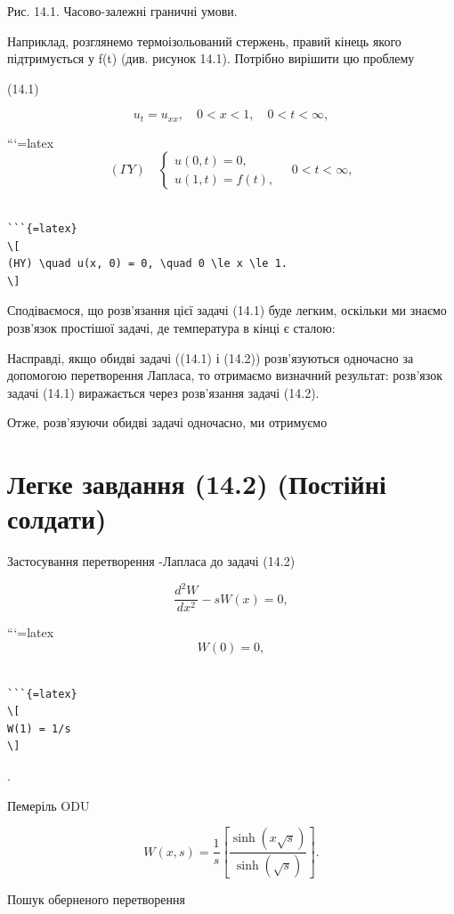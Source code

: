 \documentclass[
]{article}
\begin{document}
Рис. 14.1. Часово-залежні граничні умови.

Наприклад, розглянемо термоізольований стержень, правий кінець якого
підтримується у f(t) (див. рисунок 14.1). Потрібно вирішити цю проблему

(14.1)

\[
u_{t} = u_{xx}, \quad 0 < x < 1, \quad 0 < t < \infty,
\]

```{=latex}
\[
(\Gamma Y) \quad \begin{cases} u(0, t) = 0, \\ u(1, t) = f(t), \end{cases} \quad 0 < t < \infty,
\]

\begin{verbatim}

```{=latex}
\[
(HY) \quad u(x, 0) = 0, \quad 0 \le x \le 1.
\]
\end{verbatim}

Сподіваємося, що розв'язання цієї задачі (14.1) буде легким, оскільки ми
знаємо розв'язок простішої задачі, де температура в кінці є сталою:

Насправді, якщо обидві задачі ((14.1) і (14.2)) розв'язуються одночасно
за допомогою перетворення Лапласа, то отримаємо визначний результат:
розв'язок задачі (14.1) виражається через розв'язання задачі (14.2).

Отже, розв'язуючи обидві задачі одночасно, ми отримуємо

\section{Легке завдання (14.2) (Постійні
солдати)}\label{ux43bux435ux433ux43aux435-ux437ux430ux432ux434ux430ux43dux43dux44f-14.2-ux43fux43eux441ux442ux456ux439ux43dux456-ux441ux43eux43bux434ux430ux442ux438}

Застосування перетворення -Лапласа до задачі (14.2)

\[
\frac{d^2W}{dx^2} - sW(x) = 0,
\]

```{=latex}
\[
W(0) = 0,
\]

\begin{verbatim}

```{=latex}
\[
W(1) = 1/s
\]
\end{verbatim}

.

Пемеріль ODU

\[
W(x, s) = \frac{1}{s} \left[ \frac{\sinh(x \sqrt{s})}{\sinh(\sqrt{s})} \right].
\]

Пошук оберненого перетворення
\end{document}
